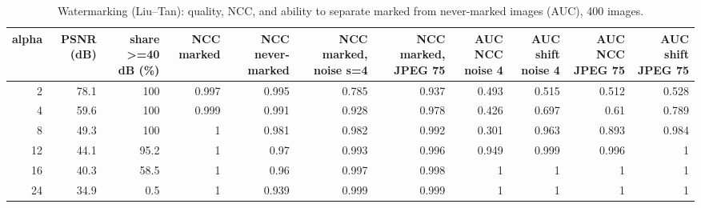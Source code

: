 \begin{table}[htbp]
\caption{Watermarking (Liu--Tan): quality, NCC, and ability to separate marked from never-marked images (AUC), 400 images.}
\label{tab:watermark}
\begin{tabular}{rrrrrrrrrrr}
\toprule
alpha & PSNR (dB) & share >=40 dB (\%) & NCC marked & NCC never-marked & NCC marked, noise s=4 & NCC marked, JPEG 75 & AUC NCC noise 4 & AUC shift noise 4 & AUC NCC JPEG 75 & AUC shift JPEG 75 \\
\midrule
2 & 78.1 & 100 & 0.997 & 0.995 & 0.785 & 0.937 & 0.493 & 0.515 & 0.512 & 0.528 \\
4 & 59.6 & 100 & 0.999 & 0.991 & 0.928 & 0.978 & 0.426 & 0.697 & 0.61 & 0.789 \\
8 & 49.3 & 100 & 1 & 0.981 & 0.982 & 0.992 & 0.301 & 0.963 & 0.893 & 0.984 \\
12 & 44.1 & 95.2 & 1 & 0.97 & 0.993 & 0.996 & 0.949 & 0.999 & 0.996 & 1 \\
16 & 40.3 & 58.5 & 1 & 0.96 & 0.997 & 0.998 & 1 & 1 & 1 & 1 \\
24 & 34.9 & 0.5 & 1 & 0.939 & 0.999 & 0.999 & 1 & 1 & 1 & 1 \\
\bottomrule
\end{tabular}
\end{table}

